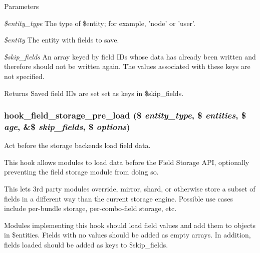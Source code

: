 \begin{DoxyParams}{Parameters}
\item[{\em \$entity\_\-type}]The type of \$entity; for example, 'node' or 'user'. \item[{\em \$entity}]The entity with fields to save. \item[{\em \$skip\_\-fields}]An array keyed by field IDs whose data has already been written and therefore should not be written again. The values associated with these keys are not specified. \end{DoxyParams}
\begin{DoxyReturn}{Returns}
Saved field IDs are set set as keys in \$skip\_\-fields. 
\end{DoxyReturn}
\hypertarget{group__field__storage_ga3ecb0f31afe3c91eb5ab58bfba4d33fb}{
\subsubsection[{hook\_\-field\_\-storage\_\-pre\_\-load}]{\setlength{\rightskip}{0pt plus 5cm}hook\_\-field\_\-storage\_\-pre\_\-load (\$ {\em entity\_\-type}, \/  \$ {\em entities}, \/  \$ {\em age}, \/  \&\$ {\em skip\_\-fields}, \/  \$ {\em options})}}
\label{group__field__storage_ga3ecb0f31afe3c91eb5ab58bfba4d33fb}
Act before the storage backends load field data.

This hook allows modules to load data before the Field Storage API, optionally preventing the field storage module from doing so.

This lets 3rd party modules override, mirror, shard, or otherwise store a subset of fields in a different way than the current storage engine. Possible use cases include per-\/bundle storage, per-\/combo-\/field storage, etc.

Modules implementing this hook should load field values and add them to objects in \$entities. Fields with no values should be added as empty arrays. In addition, fields loaded should be added as keys to \$skip\_\-fields.


